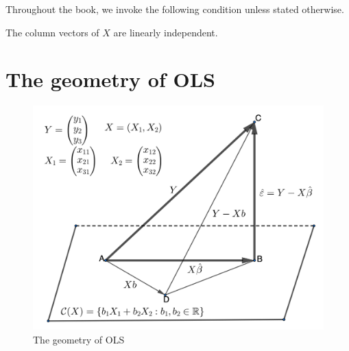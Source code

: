 Throughout the book, we invoke the following condition unless stated otherwise.
\begin{condition}
The column vectors of $X$ are linearly independent. 
\end{condition}

\section{The geometry of OLS}\label{sec::geometry-ols}


\begin{figure}
\centering
\includegraphics[width = 0.9 \textwidth]{figures/olsgeometry.png}
\caption{The geometry of OLS}\label{fig::olsgeometry}
\end{figure}

